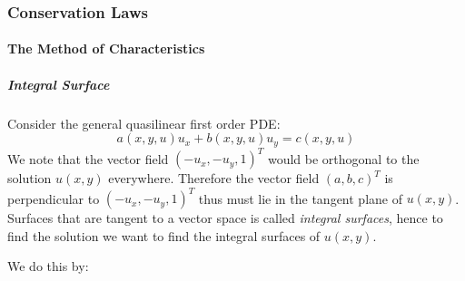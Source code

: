 \subsubsection{Conservation Laws}

\paragraph{The Method of Characteristics}

\subparagraph{Integral Surface}

Consider the general quasilinear first order PDE:
\begin{equation}
a(x,y,u)u_x + b(x,y,u)u_y = c(x,y,u)
\end{equation}
We note that the vector field $( -u_x, -u_y, 1)^T$ would be orthogonal to the solution $u(x,y)$ everywhere. Therefore the vector field $(a, b, c)^T$ is perpendicular to $( -u_x, -u_y, 1)^T$ thus must lie in the tangent plane of $u(x,y)$. Surfaces that are tangent to a vector space is called \textit{integral surfaces}, hence to find the solution we want to find the integral surfaces of $u(x,y)$.

We do this by:

